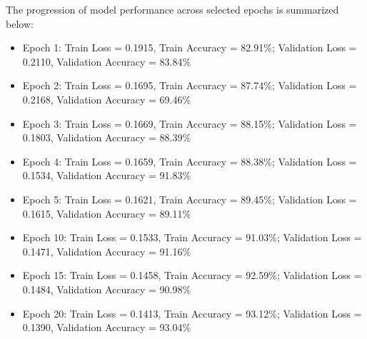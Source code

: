 The progression of model performance across selected epochs is summarized below:
\begin{itemize}
	\item Epoch 1: Train Loss = 0.1915, Train Accuracy = 82.91\%; Validation Loss = 0.2110, Validation Accuracy = 83.84\%
	\item Epoch 2: Train Loss = 0.1695, Train Accuracy = 87.74\%; Validation Loss = 0.2168, Validation Accuracy = 69.46\%
	\item Epoch 3: Train Loss = 0.1669, Train Accuracy = 88.15\%; Validation Loss = 0.1803, Validation Accuracy = 88.39\%
	\item Epoch 4: Train Loss = 0.1659, Train Accuracy = 88.38\%; Validation Loss = 0.1534, Validation Accuracy = 91.83\%
	\item Epoch 5: Train Loss = 0.1621, Train Accuracy = 89.45\%; Validation Loss = 0.1615, Validation Accuracy = 89.11\%
	\item Epoch 10: Train Loss = 0.1533, Train Accuracy = 91.03\%; Validation Loss = 0.1471, Validation Accuracy = 91.16\%
	\item Epoch 15: Train Loss = 0.1458, Train Accuracy = 92.59\%; Validation Loss = 0.1484, Validation Accuracy = 90.98\%
	\item Epoch 20: Train Loss = 0.1413, Train Accuracy = 93.12\%; Validation Loss = 0.1390, Validation Accuracy = 93.04\%
\end{itemize}

